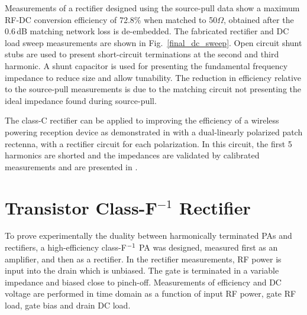 \documentclass[journal]{IEEEtran}
\begin{document}


Measurements of a rectifier designed using the source-pull data show a maximum RF-DC conversion efficiency of 72.8\% when matched to 50$\Omega$, obtained after the 0.6\,dB matching network loss is de-embedded.  The fabricated rectifier and DC load sweep measurements are shown in Fig.~\ref{final_dc_sweep}. Open circuit shunt stubs are used to present short-circuit terminations at the second and third harmonic.  A shunt capacitor is used for presenting the fundamental frequency impedance to reduce size and allow tunability.  The reduction in efficiency relative to the source-pull measurements is due to the matching circuit not presenting the ideal impedance found during source-pull.





The class-C rectifier can be applied to improving the efficiency of a wireless powering reception device as demonstrated in \cite{robergIMS2012} with a dual-linearly polarized patch rectenna, with a rectifier circuit for each polarization. In this circuit, the first 5 harmonics are shorted and the impedances are validated by calibrated measurements and are presented in \cite{robergIMS2012}.















\section{Transistor Class-F$^{-1}$ Rectifier}

To prove experimentally the duality between harmonically terminated PAs and rectifiers, a high-efficiency class-F$^{\rm -1}$ PA was designed, measured first as an amplifier, and then as a rectifier. In the rectifier measurements, RF power is input into the drain which is unbiased. The gate is terminated in a variable impedance and biased close to pinch-off. Measurements of efficiency and DC voltage are performed in time domain as a function of input RF power, gate RF load, gate bias and drain DC load. 
\end{document}
